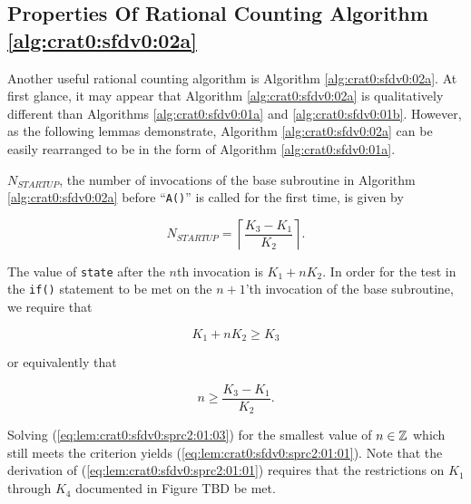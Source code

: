 \subsection[Properties Of Algorithm \ref{alg:crat0:sfdv0:02a}]
           {Properties Of Rational Counting Algorithm \ref{alg:crat0:sfdv0:02a}}
\label{crat0:sfdv0:sprc2}

Another useful rational counting algorithm is Algorithm \ref{alg:crat0:sfdv0:02a}.
At first glance, it may appear that Algorithm \ref{alg:crat0:sfdv0:02a} 
is qualitatively
different than Algorithms \ref{alg:crat0:sfdv0:01a} 
and \ref{alg:crat0:sfdv0:01b}.
However, as the following lemmas demonstrate, Algorithm \ref{alg:crat0:sfdv0:02a} 
can be easily rearranged to be in the form
of Algorithm \ref{alg:crat0:sfdv0:01a}.

\begin{vworklemmastatement}
\label{lem:crat0:sfdv0:sprc2:01}
$N_{STARTUP}$, the number of invocations of the base subroutine
in Algorithm \ref{alg:crat0:sfdv0:02a} before ``\texttt{A()}'' is called
for the first time, is given by

\begin{equation}
\label{eq:lem:crat0:sfdv0:sprc2:01:01}
N_{STARTUP} = 
\left\lceil
{
\frac{K_3 - K_1}{K_2}
}
\right\rceil .
\end{equation} 
\end{vworklemmastatement}
\begin{vworklemmaproof}
The value of \texttt{state} after the $n$th invocation
is $K_1 + n K_2$.  In order for the test in the 
\texttt{if()} statement to be met on the $n+1$'th invocation
of the base subroutine, we require that

\begin{equation}
\label{eq:lem:crat0:sfdv0:sprc2:01:02}
K_1 + n K_2 \geq K_3
\end{equation} 

\noindent{}or equivalently that

\begin{equation}
\label{eq:lem:crat0:sfdv0:sprc2:01:03}
n \geq \frac{K_3 - K_1}{K_2} .
\end{equation} 

Solving (\ref{eq:lem:crat0:sfdv0:sprc2:01:03}) for the smallest
value of $n \in {\mathbb{Z}}$ which still meets the criterion
yields (\ref{eq:lem:crat0:sfdv0:sprc2:01:01}).  Note that 
the derivation of (\ref{eq:lem:crat0:sfdv0:sprc2:01:01}) requires
that the restrictions on $K_1$ through $K_4$ documented in
Figure TBD
be met.
\end{vworklemmaproof}


